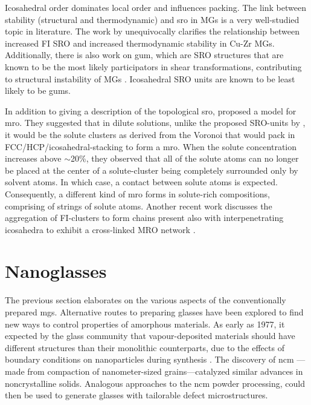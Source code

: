 Icosahedral order dominates local order and influences packing. The link between stability (structural and thermodynamic) and \gls{sro} in MGs is a very well-studied topic in literature. The work by \textcite{Cheng2008} unequivocally clarifies the relationship between increased FI SRO and increased thermodynamic stability in Cu-Zr MGs. Additionally, there is also work on \gls{gum}, which are SRO structures that are known to be the most likely participators in shear transformations, contributing to structural instability of MGs \cite{Ding2014}. Icosahedral SRO units are known to be least likely to be \gls{gum}s. \par

In addition to giving a description of the topological \gls{sro}, \textcite{Sheng2006} proposed a model for \gls{mro}. They suggested that in dilute solutions, unlike the proposed SRO-units by \textcite{Miracle2004}, it would be the solute clusters as derived from the Voronoi that would pack in FCC/HCP/icosahedral-stacking to form a \gls{mro}. When the solute concentration increases above $\sim$20\%, they observed that all of the solute atoms can no longer be placed at the center of a solute-cluster being completely surrounded only by solvent atoms. In which case, a contact between solute atoms is expected. Consequently, a different kind of \gls{mro} forms in solute-rich compositions, comprising of  strings of solute atoms. Another recent work discusses the aggregation of FI-clusters to form chains present also with interpenetrating icosahedra to exhibit a cross-linked MRO network \cite{Lee2011,Ritter2012b,Ritter2012}.

\section{Nanoglasses} \label{s:ngs}
The previous section elaborates on the various aspects of the conventionally prepared \gls{mg}s. Alternative routes to preparing glasses have been explored to find new ways to control properties of amorphous materials. As early as 1977, it expected by the glass community that vapour-deposited materials should have different structures than their monolithic counterparts, due to the effects of boundary conditions on nanoparticles during synthesis \cite{Finney1977}. The discovery of \gls{ncm} \cite{Gleiter1991}---made from compaction of nanometer-sized grains---catalyzed similar advances in noncrystalline solids.  Analogous approaches to the \gls{ncm} powder processing, could then be used to generate glasses with tailorable defect microstructures. \par

